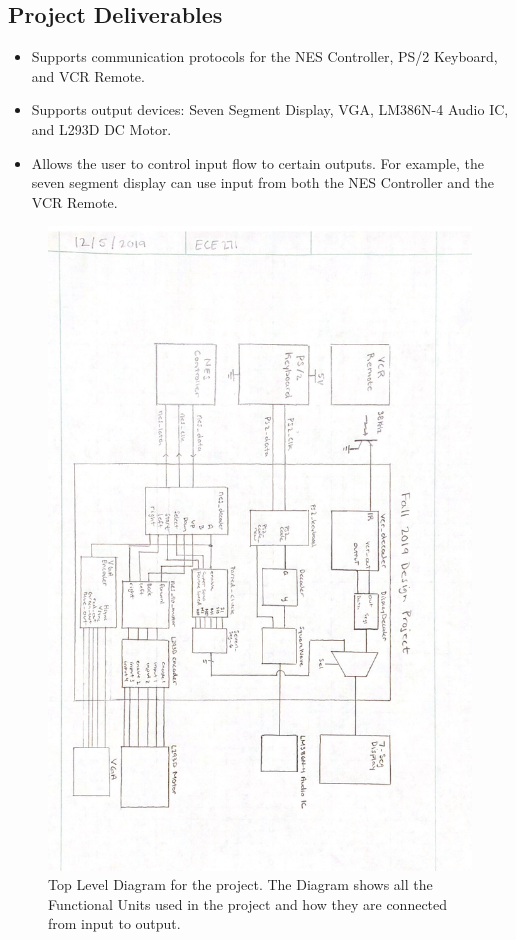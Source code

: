 \documentclass[a4paper]{article}
\begin{document}
\subsection{Project Deliverables}
  \begin{itemize}
    \item Supports communication protocols for the NES Controller, PS/2 Keyboard, and VCR Remote.
    \item Supports output devices: Seven Segment Display, VGA, LM386N-4 Audio IC, and L293D DC Motor.
    \item Allows the user to control input flow to certain outputs. For example, the seven segment display can use input from both the NES Controller and the VCR Remote.
  \end{itemize}

\begin{figure}[h]
  \centering
  \includegraphics[width=.8\textwidth]{images/project_description.png}
	\caption{Top Level Diagram for the project. The Diagram shows all the Functional Units used in the project and how they are connected from input to output.}
  \label{fig:description}
\end{figure}
\end{document}
